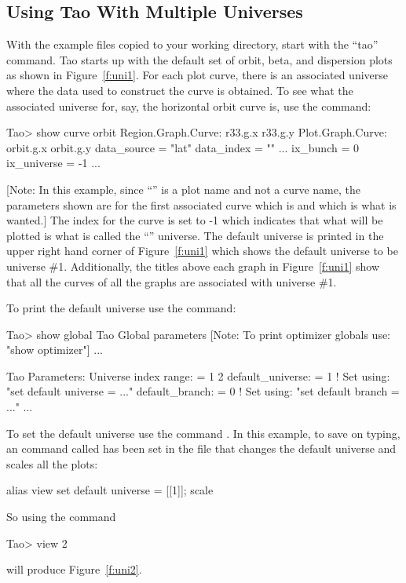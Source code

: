 \documentclass{hitec}     %
\begin{document}
{%
\subsection{Using Tao With Multiple Universes}

With the example files copied to your working directory, start \tao with the ``tao'' command. Tao
starts up with the default set of orbit, beta, and dispersion plots as shown in Figure~\ref{f:uni1}.
For each plot curve, there is an associated universe where the data used to construct the curve is
obtained. To see what the associated universe for, say, the horizontal orbit curve is, use the
 command:
\begin{code}
Tao> show curve orbit
Region.Graph.Curve: r33.g.x
                    r33.g.y
Plot.Graph.Curve:   orbit.g.x
                    orbit.g.y
data_source          = "lat"
data_index           = ""
...
ix_bunch             = 0
ix_universe          = -1
...
\end{code}
[Note: In this example, since ``'' is a plot name and not a curve name, the parameters
shown are for the first associated curve which is  and which is what is wanted.] The
 index for the curve is set to -1 which indicates that what will be plotted is what
is called the ``'' universe. The default universe is printed in the upper right hand
corner of Figure~\ref{f:uni1} which shows the default universe to be universe \#1. Additionally, the
titles above each graph in Figure~\ref{f:uni1} show that all the curves of all the graphs are
associated with universe \#1.

To print the default universe use the  command:
\begin{code}
Tao> show global
Tao Global parameters [Note: To print optimizer globals use: "show optimizer"]
  ...

Tao Parameters:
  Universe index range:        = 1  2
  default_universe:            = 1  ! Set using: "set default universe = ..."
  default_branch:              = 0  ! Set using: "set default branch = ..."
  ...
\end{code}
To set the default universe use the command . In this example, to save on typing, an
 command called  has been set in the  file that changes the default universe
and scales all the plots:
\begin{code}
alias view set default universe = [[1]]; scale
\end{code}
So using the command
\begin{code}
Tao> view 2
\end{code}
will produce Figure~\ref{f:uni2}.

}
\end{document}
